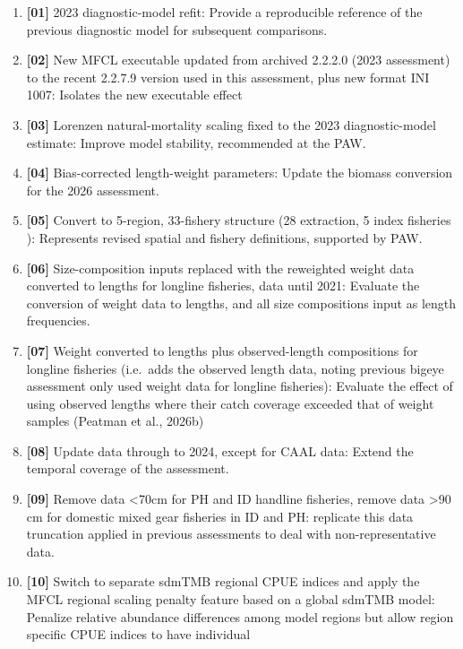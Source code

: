 \documentclass[
  english,
  a4paper,
  a4paper,
  11pt]{SCreport}
\begin{document}
\begin{enumerate}
\def\labelenumi{\arabic{enumi}.}
\item
  \textbf{{[}01{]}} 2023 diagnostic-model refit: Provide a reproducible
  reference of the previous diagnostic model for subsequent comparisons.
\item
  \textbf{{[}02{]}} New MFCL executable updated from archived 2.2.2.0
  (2023 assessment) to the recent 2.2.7.9 version used in this
  assessment, plus new format INI 1007: Isolates the new executable
  effect
\item
  \textbf{{[}03{]}} Lorenzen natural-mortality scaling fixed to the 2023
  diagnostic-model estimate: Improve model stability, recommended at the
  PAW.
\item
  \textbf{{[}04{]}} Bias-corrected length-weight parameters: Update the
  biomass conversion for the 2026 assessment.
\item
  \textbf{{[}05{]}} Convert to 5-region, 33-fishery structure (28
  extraction, 5 index fisheries ): Represents revised spatial and
  fishery definitions, supported by PAW.
\item
  \textbf{{[}06{]}} Size-composition inputs replaced with the reweighted
  weight data converted to lengths for longline fisheries, data until
  2021: Evaluate the conversion of weight data to lengths, and all size
  compositions input as length frequencies.
\item
  \textbf{{[}07{]}} Weight converted to lengths plus observed-length
  compositions for longline fisheries (i.e.~adds the observed length
  data, noting previous bigeye assessment only used weight data for
  longline fisheries): Evaluate the effect of using observed lengths
  where their catch coverage exceeded that of weight samples (Peatman et
  al., 2026b)
\item
  \textbf{{[}08{]}} Update data through to 2024, except for CAAL data:
  Extend the temporal coverage of the assessment.
\item
  \textbf{{[}09{]}} Remove data \textless70cm for PH and ID handline
  fisheries, remove data \textgreater90 cm for domestic mixed gear
  fisheries in ID and PH: replicate this data truncation applied in
  previous assessments to deal with non-representative data.
\item
  \textbf{{[}10{]}} Switch to separate sdmTMB regional CPUE indices and
  apply the MFCL regional scaling penalty feature based on a global
  sdmTMB model: Penalize relative abundance differences among model
  regions but allow region specific CPUE indices to have individual

\end{enumerate}
\end{document}
